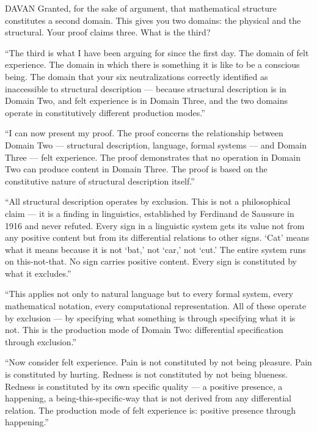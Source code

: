 \begin{tribunal}{DAVAN}
Granted, for the sake of argument, that mathematical structure constitutes a second domain. This gives you two domains: the physical and the structural. Your proof claims three. What is the third?
\end{tribunal}

\enquote{The third is what I have been arguing for since the first day. The domain of felt experience. The domain in which there is something it is like to be a conscious being. The domain that your six neutralizations correctly identified as inaccessible to structural description — because structural description is in Domain Two, and felt experience is in Domain Three, and the two domains operate in constitutively different production modes.}

\enquote{I can now present my proof. The proof concerns the relationship between Domain Two — structural description, language, formal systems — and Domain Three — felt experience. The proof demonstrates that no operation in Domain Two can produce content in Domain Three. The proof is based on the constitutive nature of structural description itself.}

\enquote{All structural description operates by exclusion. This is not a philosophical claim — it is a finding in linguistics, established by Ferdinand de Saussure in 1916 and never refuted. Every sign in a linguistic system gets its value not from any positive content but from its differential relations to other signs. \enquote*{Cat} means what it means because it is not \enquote*{bat,} not \enquote*{car,} not \enquote*{cut.} The entire system runs on this-not-that. No sign carries positive content. Every sign is constituted by what it excludes.}

\enquote{This applies not only to natural language but to every formal system, every mathematical notation, every computational representation. All of these operate by exclusion — by specifying what something is through specifying what it is not. This is the production mode of Domain Two: differential specification through exclusion.}

\enquote{Now consider felt experience. Pain is not constituted by not being pleasure. Pain is constituted by hurting. Redness is not constituted by not being blueness. Redness is constituted by its own specific quality — a positive presence, a happening, a being-this-specific-way that is not derived from any differential relation. The production mode of felt experience is: positive presence through happening.}

